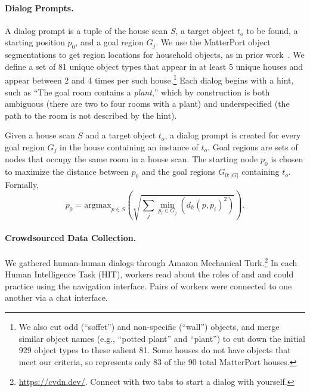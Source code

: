 \paragraph{Dialog Prompts.}
A dialog prompt is a tuple of the house scan $S$, a target object $t_o$ to be found, a starting position $p_0$, and a goal region $G_j$.
We use the MatterPort object segmentations to get region locations for household objects, as in prior work~\cite{nguyen:cvpr19}.
We define a set of 81 unique object types that appear in at least 5 unique houses and appear between 2 and 4 times per such house.\footnote{We also cut odd (``soffet'') and non-specific (``wall'') objects, and merge similar object names (e.g., ``potted plant'' and ``plant'') to cut down the initial 929 object types to these salient 81. Some houses do not have objects that meet our criteria, so \dataset{} represents only 83 of the 90 total MatterPort houses.}
Each dialog begins with a hint, such as ``The goal room contains a \textit{plant},'' which by construction is both ambiguous (there are two to four rooms with a plant) and underspecified (the path to the room is not described by the hint).

Given a house scan $S$ and a target object $t_o$, a dialog prompt is created for every goal region $G_j$ in the house containing an instance of $t_o$.
Goal regions are sets of nodes that occupy the same room in a house scan.
The starting node $p_0$ is chosen to maximize the distance between $p_0$ and the goal regions $G_{0:|G|}$ containing $t_o$.
Formally,
\begin{equation*}
    p_0 = \text{argmax}_{p\in S}\left(\sqrt{\sum_{j}{\min_{p_i\in G_j}(d_h(p, p_i)^2)}}\right).
\end{equation*}

\paragraph{Crowdsourced Data Collection.}
We gathered human-human dialogs through Amazon Mechanical Turk.\footnote{\url{https://cvdn.dev/}. Connect with two tabs to start a dialog with yourself.}
In each Human Intelligence Task (HIT), workers read about the roles of \nav{} and \ora{} and could practice using the navigation interface.
Pairs of workers were connected to one another via a chat interface.

